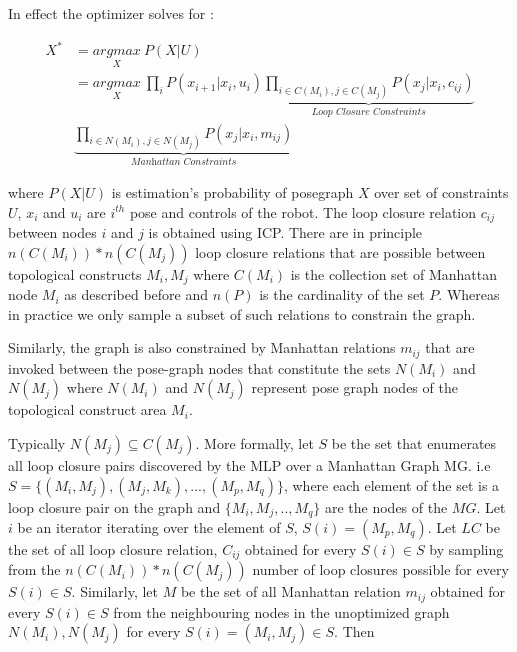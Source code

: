 \documentclass[letterpaper, 10 pt, conference]{ieeeconf}  %
\begin{document}
	In effect the optimizer solves for \cite{sunderhauf2011brief}:
	
	\begin{align*}
	X^{*} &= \underset{X}{argmax}\medspace P(X|U) \\
	&= \underset{X}{argmax}\medspace \prod_{i}P(x_{i+1} | x_{i}, u_{i}) \underset{\textit{Loop Closure Constraints}}{\underbrace{\prod_{i \in C(M_{i}), j \in C(M_{j})}P(x_{j} | x_{i}, c_{ij})}}\\ &{\underset{\textit{Manhattan Constraints}}{\underbrace{\prod_{i \in N(M_{i}), j \in N(M_{j})}P(x_{j} | x_{i}, m_{ij})}}} 
	\end{align*}
	
	where $P(X|U)$ is estimation's probability of posegraph $X$ over set of constraints $U$, $x_{i}$ and $u_{i}$ are $i^{th}$ pose and controls of the robot. The loop closure relation $c_{ij}$ between nodes $i$ and $j$ is obtained using ICP. There are in principle $n(C(M_{i})) * n(C(M_{j}))$ loop closure relations that are possible between topological constructs $M_{i}, M_{j}$ where $C(M_{i})$ is the collection set of Manhattan node $M_{i}$ as described before  and $n(P)$ is the cardinality of the set $P$. Whereas in practice we only sample a subset of such relations to constrain the graph.
	
	Similarly, the graph is also constrained by Manhattan relations $m_{ij}$ that are invoked between the pose-graph nodes that constitute the sets $N(M_{i})$ and $N(M_{j})$ where $N(M_{i})$ and $N(M_{j})$ represent pose graph nodes of the topological construct area $M_{i}$. 
	
	Typically $N(M_{j}) \subseteq C(M_{j})$. More formally, let $S$ be the set that enumerates all loop closure pairs discovered by the MLP over a Manhattan Graph MG. i.e $S = \{(M_{i},M_{j}), (M_{j},M_{k}), ..., (M_{p},M_{q})\} $, where each element of the set is a loop closure pair on the graph and $\{M_{i},M_{j},..,M_{q}\}$ are the nodes of the $MG$. Let $i$ be an iterator iterating over the element of $S$, $S(i) = (M_{p}, M_{q})$.  Let $LC$ be the set of all loop closure relation, $C_{ij}$ obtained for every $S(i) \in S$ by sampling from the $n(C(M_{i})) * n(C(M_{j}))$ number of loop closures possible for every $S(i) \in S$. Similarly, let $M$ be the set of all Manhattan relation $m_{ij}$ obtained for every $S(i) \in S$ from the neighbouring nodes in the unoptimized graph $N(M_{i}), N(M_{j})$ for every $S(i) = (M_{i},M_{j}) \in S$. Then
	
	
\end{document}
